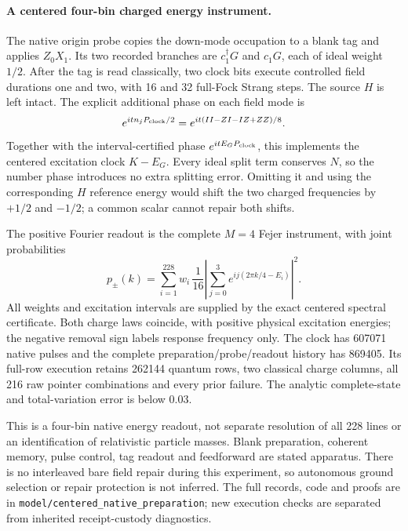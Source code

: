 \paragraph{A centered four-bin charged energy instrument.}
The native origin probe copies the down-mode occupation to a blank tag
and applies $Z_0X_1$. Its two recorded branches are
$c_1^\dagger G$ and $c_1G$, each of ideal weight $1/2$.
After the tag is read classically, two clock bits execute controlled
field durations one and two, with 16 and 32 full-Fock Strang steps.
The source $H$ is left intact. The explicit additional phase on each
field mode is
\[
 e^{it n_jP_{\rm clock}/2}
   =e^{it(II-ZI-IZ+ZZ)/8}.
\]
Together with the interval-certified phase $e^{itE_GP_{\rm clock}}$,
this implements the centered excitation clock $K-E_G$.
Every ideal split term conserves $N$, so the number phase introduces
no extra splitting error. Omitting it and using the corresponding
$H$ reference energy would shift the two charged frequencies by
$+1/2$ and $-1/2$; a common scalar cannot repair both shifts.

The positive Fourier readout is the complete $M=4$ Fejer instrument,
with joint probabilities
\[
 p_{\pm}(k)=\sum_{i=1}^{228}w_i\,
 \frac1{16}\left|\sum_{j=0}^3
        e^{ij(2\pi k/4-E_i)}\right|^2.
\]
All weights and excitation intervals are supplied by the exact centered
spectral certificate. Both charge laws coincide, with positive physical
excitation energies; the negative removal sign labels response
frequency only. The clock has 607071 native pulses and the complete
preparation/probe/readout history has 869405. Its full-row execution
retains 262144 quantum rows, two classical charge columns, all 216 raw
pointer combinations and every prior failure. The analytic complete-state
and total-variation error is below $0.03$.

This is a four-bin native energy readout, not separate resolution of
all 228 lines or an identification of relativistic particle masses.
Blank preparation, coherent memory, pulse control, tag readout and
feedforward are stated apparatus. There is no interleaved bare field
repair during this experiment, so autonomous ground selection or
repair protection is not inferred. The full records, code and proofs
are in \texttt{model/centered\_native\_preparation}; new execution checks
are separated from inherited receipt-custody diagnostics.
